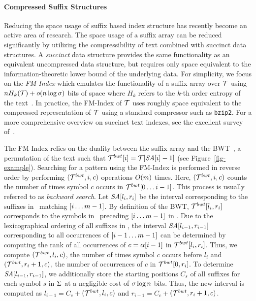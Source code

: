 \paragraph{Compressed Suffix Structures}
\label{sec-css}

Reducing the space usage of suffix based index structure has recently become an 
active area of research. The space usage of a suffix array can be reduced 
significantly by utilizing the compressibility of text combined 
with succinct data structures. A {\it succinct} data structure provides the
same functionality as an equivalent uncompressed data structure, but requires
only space equivalent to the information-theoretic lower bound of the underlying
data. For simplicity, we focus on the {\it FM-Index} which emulates the
functionality of a suffix array over $\mathcal{T}$ using $n H_k(\mathcal{T})+o(n \log \sigma)$
bits of space where $H_k$ refers to the $k$-th order entropy of the text~\cite{fmmn-talg07}.
In practice, the FM-Index of $\mathcal{T}$ uses roughly space equivalent to
the compressed representation of $\mathcal{T}$ using a standard compressor such as {\tt bzip2}.
For a more comprehensive overview on succinct text indexes, see the
excellent survey of~.

The FM-Index relies on the duality between the suffix array and the BWT~\cite{bw-dec94}, 
a permutation of the text such that $\mathcal{T}^{bwt}[i] = \mathcal{T}[\mbox{\emph{SA}}[i]-1]$ (see Figure~\ref{fig-example}). Searching for
a pattern using the FM-Index is performed in reverse order by performing  
{\rankop$(\mathcal{T}^{bwt},i,c)$} operations $O(m)$ times. Here, {\rankop$(\mathcal{T}^{bwt},i,c)$}  
counts the number of times symbol $c$ occurs in $\mathcal{T}^{bwt}[0\ldots i-1]$. 
This process is usually referred to as {\it backward search}. Let $\mbox{\emph{SA}}[l_i,r_i]$ be
the interval corresponding to the suffixes in \col\ matching \pattern$[i\ldots m-1]$.
By definition of the BWT, $\mathcal{T}^{bwt}[l_i,r_i]$ corresponds to the symbols in \col\
preceding \pattern$[i\ldots m-1]$ in \col. Due to the lexicographical ordering
of all suffixes in \SA, the interval $\mbox{\emph{SA}}[l_{i-1},r_{i-1}]$ corresponding to all
occurrences of \pattern$[i-1\ldots m-1]$ can be determined by computing the rank
of all occurrences of $c=\alpha[i-1]$ in $\mathcal{T}^{bwt}[l_i,r_i]$. Thus, we compute
\rankop$(\mathcal{T}^{bwt},l_i,c)$, the number of times symbol $c$ occurs before
$l_i$ and \rankop$(\mathcal{T}^{bwt},r_i+1,c)$, the number of occurrences of $c$ in $\mathcal{T}^{bwt}[0,r_i]$.
To determine $\mbox{\emph{SA}}[l_{i-1},r_{i-1}]$, we additionally store the starting positions $C_{s}$
of all suffixes for each symbol $s$ in $\Sigma$ at a negligible cost 
of $\sigma \log n$ bits.
Thus, the new interval is computed as $l_{i-1} = C_c + $\rankop$(\mathcal{T}^{bwt},l_i,c)$ 
and $r_{i-1} = C_c + $\rankop$(\mathcal{T}^{bwt},r_i+1,c)$.


